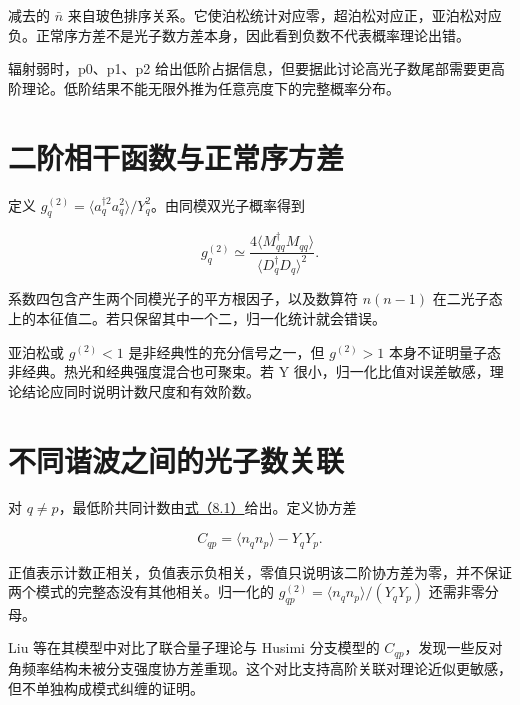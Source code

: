 \documentclass[UTF8,a4paper,zihao=-4,openany,fontset=fandol]{ctexbook}
\begin{document}
减去的 $\bar n$ 来自玻色排序关系。它使泊松统计对应零，超泊松对应正，亚泊松对应负。正常序方差不是光子数方差本身，因此看到负数不代表概率理论出错。



辐射弱时，p0、p1、p2 给出低阶占据信息，但要据此讨论高光子数尾部需要更高阶理论。低阶结果不能无限外推为任意亮度下的完整概率分布。



\section{二阶相干函数与正常序方差}\label{sec:08:6}


定义 $g_q^{(2)}=\langle a_q^{\dagger2}a_q^2\rangle/Y_q^2$。由同模双光子概率得到



\begin{equation*}
g_q^{(2)}\simeq
\frac{4\langle M_{qq}^\dagger M_{qq}\rangle}
{\langle D_q^\dagger D_q\rangle^2}.
\tag{8.3}\label{eq:8.3}
\end{equation*}


系数四包含产生两个同模光子的平方根因子，以及数算符 $n(n-1)$ 在二光子态上的本征值二。若只保留其中一个二，归一化统计就会错误。



亚泊松或 $g^{(2)}<1$ 是非经典性的充分信号之一，但 $g^{(2)}>1$ 本身不证明量子态非经典。热光和经典强度混合也可聚束。若 Y 很小，归一化比值对误差敏感，理论结论应同时说明计数尺度和有效阶数。



\section{不同谐波之间的光子数关联}\label{sec:08:7}


对 $q\ne p$，最低阶共同计数由\hyperref[eq:8.1]{式（8.1）}给出。定义协方差



\begin{equation*}
C_{qp}=\langle n_qn_p\rangle-Y_qY_p.
\tag{8.4}\label{eq:8.4}
\end{equation*}


正值表示计数正相关，负值表示负相关，零值只说明该二阶协方差为零，并不保证两个模式的完整态没有其他相关。归一化的 $g_{qp}^{(2)}=\langle n_qn_p\rangle/(Y_qY_p)$ 还需非零分母。



Liu 等在其模型中对比了联合量子理论与 Husimi 分支模型的 $C_{qp}$，发现一些反对角频率结构未被分支强度协方差重现。这个对比支持高阶关联对理论近似更敏感，但不单独构成模式纠缠的证明。
\end{document}
